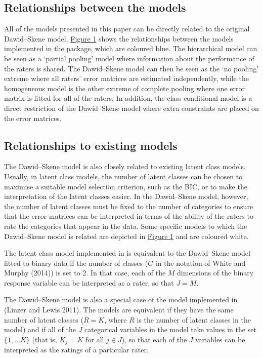 \hypertarget{relationships-between-the-models}{%
\subsection{Relationships between the models}\label{relationships-between-the-models}}

All of the models presented in this paper can be directly related to the
original Dawid--Skene model. \protect\hyperlink{fig:relationships}{Figure 1} shows the
relationships between the models implemented in the package, which are
coloured blue. The hierarchical model can be seen as a `partial pooling'
model where information about the performance of the raters is shared.
The Dawid--Skene model can then be seen as the `no pooling' extreme
where all raters' error matrices are estimated independently, while the
homogeneous model is the other extreme of complete pooling where one
error matrix is fitted for all of the raters. In addition, the
class-conditional model is a direct restriction of the Dawid--Skene
model where extra constraints are placed on the error matrices.

\hypertarget{sec:relationships-existing-models}{%
\subsection{Relationships to existing models}\label{sec:relationships-existing-models}}

The Dawid--Skene model is also closely related to existing latent class
models. Usually, in latent class models, the number of latent classes
can be chosen to maximise a suitable model selection criterion, such as
the BIC, or to make the interpretation of the latent classes easier. In
the Dawid--Skene model, however, the number of latent classes must be
fixed to the number of categories to ensure that the error matrices can
be interpreted in terms of the ability of the raters to rate the
categories that appear in the data. Some specific models to which the
Dawid--Skene model is related are depicted in \protect\hyperlink{fig:relationships}{Figure 1}
and are coloured white.

The latent class model implemented in
 is equivalent
to the Dawid--Skene model fitted to binary data if the number of classes
(\(G\) in the notation of White and Murphy (2014)) is set to 2. In that case, each of
the \(M\) dimensions of the binary response variable can be interpreted as
a rater, so that \(J = M\).

The Dawid--Skene model is also a special case of the model implemented
in  (Linzer and Lewis 2011). The models are equivalent if they have the
same number of latent classes (\(R = K\), where \(R\) is the number of latent
classes in the  model) and if all of
the \(J\) categorical variables in the  model take values in
the set \(\{1, \dots K\}\) (that is, \(K_j = K\) for all \(j \in J\)), so that
each of the \(J\) variables can be interpreted as the ratings of a
particular rater.

